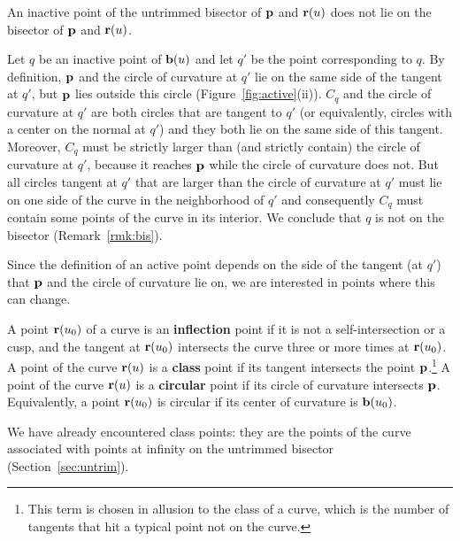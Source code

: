\begin{propn}
An inactive point of the untrimmed bisector of ${\bf p}$ and ${\bf r}(u)$
does not lie on the bisector of ${\bf p}$ and ${\bf r}(u)$.
\end{propn}
\prf
Let $q$ be an inactive point of ${\bf b}(u)$ 
and let $q'$ be the point corresponding to $q$.
By definition, ${\bf p}$ and the circle of curvature at $q'$ lie
on the same side of the tangent at $q'$, but ${\bf p}$ lies outside this
circle (Figure~\ref{fig:active}(ii)).
$C_q$ and the circle of curvature at $q'$ are both circles that are
tangent to $q'$ (or equivalently, circles with a center on the normal at $q'$)
and they both lie on the same side of this tangent.
Moreover, $C_q$ must be strictly larger than (and strictly contain)
the circle of curvature at $q'$, because it reaches ${\bf p}$ while the circle
of curvature does not.
But all circles tangent at $q'$ that are larger than the circle of curvature
at $q'$ must lie on one side of the curve in the neighborhood of $q'$
\cite[p. 176]{H52} and consequently $C_q$ must contain some points of the curve
in its interior.
We conclude that $q$ is not on the bisector (Remark~\ref{rmk:bis}).
\QED

Since the definition of an active point depends on the side of the tangent
(at $q'$) that ${\bf p}$ and the circle of curvature lie on, 
we are interested in points where this can change.

\begin{dfn}
\label{d:trim}
A point ${\bf r}(u_{0})$ of a curve is an {\bf inflection} point
if it is not a self-intersection or a cusp, and the tangent at 
${\bf r}(u_{0})$ intersects the curve three or more times at ${\bf r}(u_{0})$.
A point of the curve ${\bf r}(u)$ is a {\bf class}
point if its tangent intersects the point ${\bf p}$.\footnote{This
	term is chosen in allusion to the class of a curve, which is the
	number of tangents that hit a typical point not on the curve.}
A point of the curve ${\bf r}(u)$ is a {\bf circular} point
if its circle of curvature intersects ${\bf p}$.
Equivalently, a point ${\bf r}(u_{0})$ is circular 
if its center of curvature is ${\bf b}(u_{0})$.
\end{dfn}

We have already encountered class points: they are the points of the curve 
associated with points at infinity on the untrimmed bisector 
(Section~\ref{sec:untrim}).

